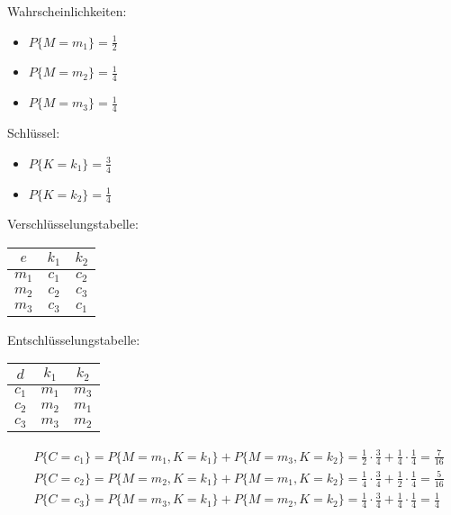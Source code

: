   \begin{multicols}{2}
    Wahrscheinlichkeiten:

    \begin{itemize}
      \item $P\{M = m_1\} = \frac{1}{2}$
      \item $P\{M = m_2\} = \frac{1}{4}$
      \item $P\{M = m_3\} = \frac{1}{4}$
    \end{itemize}

    \columnbreak

    Schlüssel:

    \begin{itemize}
      \item $P\{K = k_1\} = \frac{3}{4}$
      \item $P\{K = k_2\} = \frac{1}{4}$
    \end{itemize}
  \end{multicols}

  \begin{multicols}{2}
    Verschlüsselungstabelle:

    \begin{tabular}{|*3{c|}}
      \hline
      $e$ & $k_1$ & $k_2$ \\
      \hline
      $m_1$ & $c_1$ & $c_2$ \\
      $m_2$ & $c_2$ & $c_3$ \\
      $m_3$ & $c_3$ & $c_1$ \\
      \hline
    \end{tabular}

    \columnbreak

    Entschlüsselungstabelle:

    \begin{tabular}{|*3{c|}}
      \hline
      $d$ & $k_1$ & $k_2$ \\
      \hline
      $c_1$ & $m_1$ & $m_3$ \\
      $c_2$ & $m_2$ & $m_1$ \\
      $c_3$ & $m_3$ & $m_2$ \\
      \hline
    \end{tabular}
  \end{multicols}

  \begin{align*}
    & P\{C = c_1\} = P\{M = m_1, K = k_1\} + P\{M = m_3, K = k_2\} = \frac{1}{2} \cdot \frac{3}{4} + \frac{1}{4} \cdot \frac{1}{4} = \frac{7}{16}\\
    & P\{C = c_2\} = P\{M = m_2, K = k_1\} + P\{M = m_1, K = k_2\} = \frac{1}{4} \cdot \frac{3}{4} + \frac{1}{2} \cdot \frac{1}{4} = \frac{5}{16}\\
    & P\{C = c_3\} = P\{M = m_3, K = k_1\} + P\{M = m_2, K = k_2\} = \frac{1}{4} \cdot \frac{3}{4} + \frac{1}{4} \cdot \frac{1}{4} = \frac{1}{4}\\
  \end{align*}

